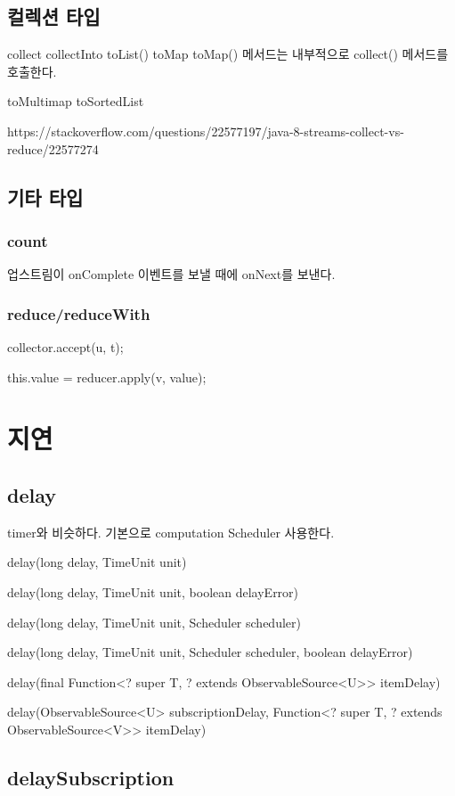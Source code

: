 \documentclass{book}
\begin{document}
{\subsection{컬렉션 타입}
collect
collectInto
toList()
toMap
toMap() 메서드는 내부적으로 collect() 메서드를 호출한다.

toMultimap
toSortedList

https://stackoverflow.com/questions/22577197/java-8-streams-collect-vs-reduce/22577274

\subsection{기타 타입}
\subsubsection{count}
업스트림이 onComplete 이벤트를 보낼 때에 onNext를 보낸다.

\subsubsection{reduce/reduceWith}
collector.accept(u, t);

this.value = reducer.apply(v, value);

\section{지연}
\subsection{delay}
timer와 비슷하다.
기본으로 computation Scheduler 사용한다.

delay(long delay, TimeUnit unit)

delay(long delay, TimeUnit unit, boolean delayError)

delay(long delay, TimeUnit unit, Scheduler scheduler)

delay(long delay, TimeUnit unit, Scheduler scheduler, boolean delayError)

delay(final Function<? super T, ? extends ObservableSource<U>> itemDelay)

delay(ObservableSource<U> subscriptionDelay,
            Function<? super T, ? extends ObservableSource<V>> itemDelay)

\subsection{delaySubscription}

}
\end{document}
